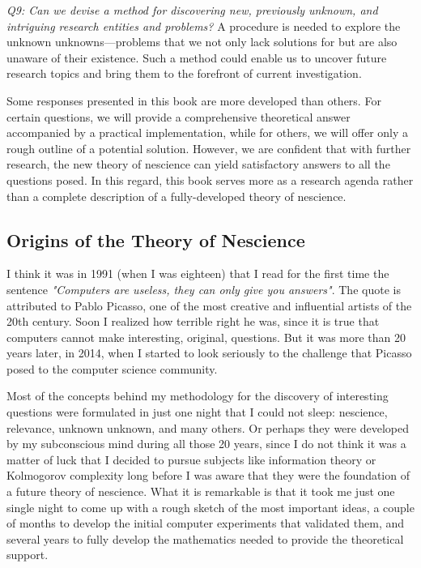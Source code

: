 \emph{Q9: Can we devise a method for discovering new, previously unknown, and intriguing research entities and problems?} A procedure is needed to explore the unknown unknowns—problems that we not only lack solutions for but are also unaware of their existence. Such a method could enable us to uncover future research topics and bring them to the forefront of current investigation.

Some responses presented in this book are more developed than others. For certain questions, we will provide a comprehensive theoretical answer accompanied by a practical implementation, while for others, we will offer only a rough outline of a potential solution. However, we are confident that with further research, the new theory of nescience can yield satisfactory answers to all the questions posed. In this regard, this book serves more as a research agenda rather than a complete description of a fully-developed theory of nescience.

%
%

\subsection*{Origins of the Theory of Nescience}

I think it was in 1991 (when I was eighteen) that I read for the first time the sentence \emph{"Computers are useless, they can only give you answers"}. The quote is attributed to Pablo Picasso, one of the most creative and influential artists of the 20th century. Soon I realized how terrible right he was, since it is true that computers cannot make interesting, original, questions. But it was more than 20 years later, in 2014, when I started to look seriously to the challenge that Picasso posed to the computer science community.

Most of the concepts behind my methodology for the discovery of interesting questions were formulated in just one night that I could not sleep: nescience, relevance, unknown unknown, and many others. Or perhaps they were developed by my subconscious mind during all those 20 years, since I do not think it was a matter of luck that I decided to pursue subjects like information theory or Kolmogorov complexity long before I was aware that they were the foundation of a future theory of nescience. What it is remarkable is that it took me just one single night to come up with a rough sketch of the most important ideas, a couple of months to develop the initial computer experiments that validated them, and several years to fully develop the mathematics needed to provide the theoretical support.

